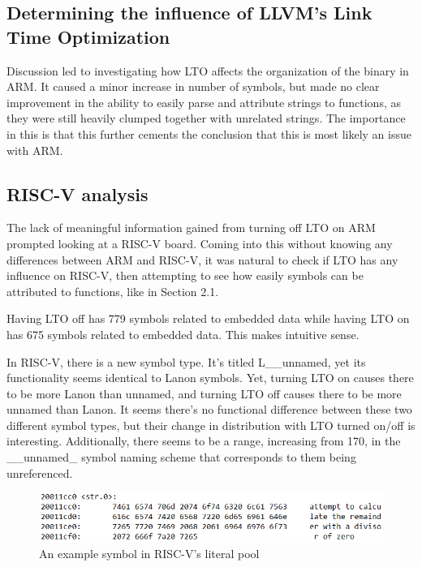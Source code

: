 \documentclass{article}
\begin{document}
\subsection{Determining the influence of LLVM's Link Time Optimization}

Discussion led to investigating how LTO affects the organization of the binary in ARM. It caused a minor increase in number of symbols, but made no clear improvement in the ability to easily parse and attribute strings to functions, as they were still heavily clumped together with unrelated strings. The importance in this is that this further cements the conclusion that this is most likely an issue with ARM.

\subsection{RISC-V analysis}

The lack of meaningful information gained from turning off LTO on ARM prompted looking at a RISC-V board. Coming into this without knowing any differences between ARM and RISC-V, it was natural to check if LTO has any influence on RISC-V, then attempting to see how easily symbols can be attributed to functions, like in Section 2.1.

Having LTO off has 779 symbols related to embedded data while having LTO on has 675 symbols related to embedded data. This makes intuitive sense.

In RISC-V, there is a new symbol type. It's titled L\_\_unnamed, yet its functionality seems identical to Lanon symbols. Yet, turning LTO on causes there to be more Lanon than unnamed, and turning LTO off causes there to be more unnamed than Lanon. It seems there's no functional difference between these two different symbol types, but their change in distribution with LTO turned on/off is interesting. Additionally, there seems to be a range, increasing from 170, in the \_\_unnamed\_ symbol naming scheme that corresponds to them being unreferenced.

\begin{figure}[h]
\centering
\includegraphics[width=.8\textwidth]{riscv_str0_img.png}
\caption{\label{fig:riscv_str0}An example symbol in RISC-V's literal pool}
\end{figure}
\end{document}
